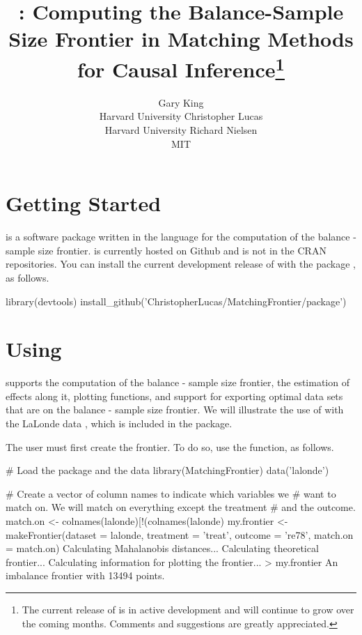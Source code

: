 \documentclass[nojss]{jss}
\author{Gary King\\Harvard University \And 
        Christopher Lucas\\Harvard University \And 
        Richard Nielsen\\MIT}
\title{\pkg{MatchingFrontier}: Computing the Balance-Sample Size Frontier in Matching Methods for Causal Inference\thanks{The current release of \pkg{MatchingFrontier} is in active development and will continue to grow over the coming months. Comments and suggestions are greatly appreciated.}}
\begin{document}


\section[Usage]{Getting Started}

 is a software package written in the 
language \citep{r2012} for the computation of the balance - sample
size frontier.  is currently hosted on Github
and is not in the CRAN repositories. You can install the current
development release of  with the 
package \citep{wickham2013}, as follows.

\begin{Code}
  library(devtools) 
  install_github('ChristopherLucas/MatchingFrontier/package')
\end{Code} 

\section[Usage]{Using }

 supports the computation of the balance -
sample size frontier, the estimation of effects along it, plotting
functions, and support for exporting optimal data sets that are on the
balance - sample size frontier. We will illustrate the use of
 with the LaLonde data
\citep{lalonde1986,dehejia1999}, which is included in the package.

The user must first create the frontier. To do so, use the 
function, as follows. 

\begin{CodeChunk}
\begin{CodeInput}
  # Load the package and the data
  library(MatchingFrontier)
  data('lalonde')

  # Create a vector of column names to indicate which variables we 
  # want to match on. We will match on everything except the treatment
  # and the outcome.
  match.on <- colnames(lalonde)[!(colnames(lalonde) %
  my.frontier <- makeFrontier(dataset = lalonde, 
                              treatment = 'treat', 
                              outcome = 're78', 
                              match.on = match.on)
  Calculating Mahalanobis distances...
  Calculating theoretical frontier...
  Calculating information for plotting the frontier...
  > my.frontier
  An imbalance frontier with 13494 points.
\end{CodeInput}
\end{CodeChunk}
\end{document}
